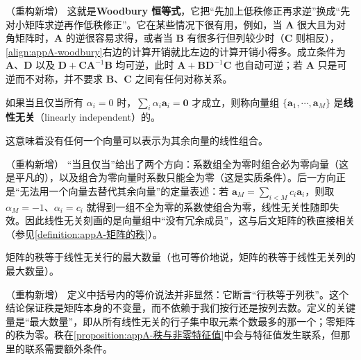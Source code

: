 \documentclass[../main.tex]{subfiles}
\begin{document}
\begin{remark}（重构新增）
这就是\textbf{Woodbury 恒等式}，它把“先加上低秩修正再求逆”换成“先对小矩阵求逆再作低秩修正”。它在某些情况下很有用，例如，当 $\bm{A}$ 很大且为对角矩阵时，$\bm{A}$ 的逆很容易求得，或者当 $\bm{B}$ 有很多行但列较少时（$\bm{C}$ 则相反），\eqref{align:appA-woodbury}右边的计算开销就比左边的计算开销小得多。成立条件为 $\bm{A}$、$\bm{D}$ 以及 $\bm{D}+\bm{C}\bm{A}^{-1}\bm{B}$ 均可逆，此时 $\bm{A}+\bm{B}\bm{D}^{-1}\bm{C}$ 也自动可逆；若 $\bm{A}$ 只是可逆而不对称，并不要求 $\bm{B}$、$\bm{C}$ 之间有任何对称关系。
\end{remark}


\begin{definition}[线性无关]\label{definition:appA-线性无关}
如果当且仅当所有 $\alpha_i=0$ 时，$\sum_i\alpha_i\bm{a}_i=\bm{0}$ 才成立，则称向量组 $\{\bm{a}_1,\cdots,\bm{a}_M\}$ 是\textbf{线性无关}（linearly independent）的。
\end{definition}

这意味着没有任何一个向量可以表示为其余向量的线性组合。

\begin{remark}（重构新增）
“当且仅当”给出了两个方向：系数组全为零时组合必为零向量（这是平凡的），以及组合为零向量时系数只能全为零（这是实质条件）。后一方向正是“无法用一个向量去替代其余向量”的定量表述：若 $\bm{a}_M=\sum_{i<M}c_i\bm{a}_i$，则取 $\alpha_M=-1$、$\alpha_i=c_i$ 就得到一组不全为零的系数使组合为零，线性无关性随即失效。因此线性无关刻画的是向量组中“没有冗余成员”，这与后文矩阵的秩直接相关（参见\cref{definition:appA-矩阵的秩}）。
\end{remark}

\begin{definition}[矩阵的秩]\label{definition:appA-矩阵的秩}
矩阵的秩等于线性无关行的最大数量（也可等价地说，矩阵的秩等于线性无关列的最大数量）。
\end{definition}

\begin{remark}（重构新增）
定义中括号内的等价说法并非显然：它断言“行秩等于列秩”。这个结论保证秩是矩阵本身的不变量，而不依赖于我们按行还是按列去数。定义的关键量是“最大数量”，即从所有线性无关的行子集中取元素个数最多的那一个；零矩阵的秩为零。秩在\cref{proposition:appA-秩与非零特征值}中会与特征值发生联系，但那里的联系需要额外条件。
\end{remark}
\end{document}
